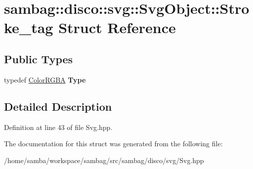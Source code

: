\hypertarget{structsambag_1_1disco_1_1svg_1_1_svg_object_1_1_stroke__tag}{
\section{sambag::disco::svg::SvgObject::Stroke\_\-tag Struct Reference}
\label{structsambag_1_1disco_1_1svg_1_1_svg_object_1_1_stroke__tag}
}
\subsection*{Public Types}
\begin{DoxyCompactItemize}
\item 
\hypertarget{structsambag_1_1disco_1_1svg_1_1_svg_object_1_1_stroke__tag_ac954a56f9d35f99d8170aff10cde2573}{
typedef \hyperlink{structsambag_1_1com_1_1_color_r_g_b_a}{ColorRGBA} {\bfseries Type}}
\label{structsambag_1_1disco_1_1svg_1_1_svg_object_1_1_stroke__tag_ac954a56f9d35f99d8170aff10cde2573}

\end{DoxyCompactItemize}


\subsection{Detailed Description}


Definition at line 43 of file Svg.hpp.



The documentation for this struct was generated from the following file:\begin{DoxyCompactItemize}
\item 
/home/samba/workspace/sambag/src/sambag/disco/svg/Svg.hpp\end{DoxyCompactItemize}
